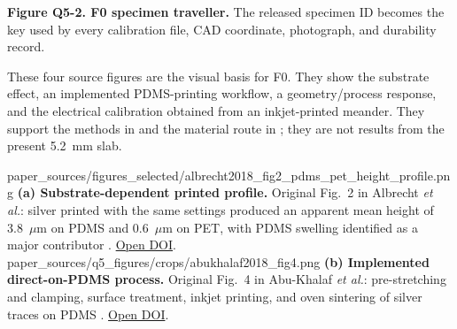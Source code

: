 \vspace{0.5em}
\begin{center}
\end{center}
{\fontsize{7.5}{8.7}\selectfont\color{AUBGray}
\textbf{Figure Q5-2. F0 specimen traveller.} The released specimen ID becomes
the key used by every calibration file, CAD coordinate, photograph, and
durability record.\par}

\clearpage
\hypertarget{q5-lit-fabrication}{}

{\fontsize{8.75}{10.25}\selectfont
These four source figures are the visual basis for F0. They show the substrate
effect, an implemented PDMS-printing workflow, a geometry/process response,
and the electrical calibration obtained from an inkjet-printed meander. They
support the methods in  and the material
route in ; they are not results
from the present 5.2~mm slab.\par}

\vspace{0.55em}
\noindent
\qfivelitpanel{0.195\textheight}
  {paper_sources/figures_selected/albrecht2018_fig2_pdms_pet_height_profile.png}
  {\textbf{(a) Substrate-dependent printed profile.} Original Fig.~2 in
  Albrecht \textit{et al.}: silver printed with the same settings produced an
  apparent mean height of 3.8~$\mu$m on PDMS and 0.6~$\mu$m on PET, with PDMS
  swelling identified as a major contributor \cite{albrecht2018stretch}.
  \href{https://doi.org/10.3390/polym10121413}{Open DOI}.}
\hfill
\qfivelitpanel{0.195\textheight}
  {paper_sources/q5_figures/crops/abukhalaf2018_fig4.png}
  {\textbf{(b) Implemented direct-on-PDMS process.} Original Fig.~4 in
  Abu-Khalaf \textit{et al.}: pre-stretching and clamping, surface treatment,
  inkjet printing, and oven sintering of silver traces on PDMS
  \cite{q4abukhalaf2018}.
  \href{https://doi.org/10.3390/ma11122377}{Open DOI}.}

